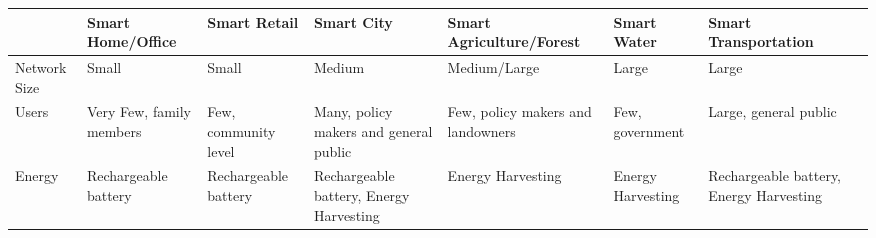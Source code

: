 \begin{landscape}
  \begin{table}[p]
    \centering
    \begin{adjustbox}{width=\textwidth}
      \begin{tabular}{*{14}{l}}
      \toprule
      ~                      & \multicolumn{2}{l}{Smart Home/Office}                                  & \multicolumn{2}{l}{Smart Retail}                                       & \multicolumn{2}{l}{Smart City}                                                      & \multicolumn{2}{l}{Smart Agriculture/Forest}                                  & \multicolumn{2}{l}{Smart Water}                                                              & \multicolumn{2}{l}{Smart Transportation}                                             \\
      \midrule
      Network Size           & \multicolumn{2}{p{\colWidth}}{\raggedright Small}                      & \multicolumn{2}{p{\colWidth}}{\raggedright Small}                      & \multicolumn{2}{p{\colWidth}}{\raggedright Medium}                                  & \multicolumn{2}{p{\colWidth}}{\raggedright Medium/Large}                      & \multicolumn{2}{p{\colWidth}}{\raggedright Large}                                            & \multicolumn{2}{p{\colWidth}}{\raggedright Large}                                    \\ \midrule
      Users                  & \multicolumn{2}{p{\colWidth}}{\raggedright Very Few, family members}   & \multicolumn{2}{p{\colWidth}}{\raggedright Few, community level}       & \multicolumn{2}{p{\colWidth}}{\raggedright Many, policy makers and general public}  & \multicolumn{2}{p{\colWidth}}{\raggedright Few, policy makers and landowners} & \multicolumn{2}{p{\colWidth}}{\raggedright Few, government}                                  & \multicolumn{2}{p{\colWidth}}{\raggedright Large, general public}                    \\ \midrule
      Energy                 & \multicolumn{2}{p{\colWidth}}{\raggedright Rechargeable battery}       & \multicolumn{2}{p{\colWidth}}{\raggedright Rechargeable battery}       & \multicolumn{2}{p{\colWidth}}{\raggedright Rechargeable battery, Energy Harvesting} & \multicolumn{2}{p{\colWidth}}{\raggedright Energy Harvesting}                 & \multicolumn{2}{p{\colWidth}}{\raggedright Energy Harvesting}                                & \multicolumn{2}{p{\colWidth}}{\raggedright Rechargeable battery, Energy Harvesting}  \\ \midrule

\end{tabular}
\end{adjustbox}
\end{table}
\end{landscape}
